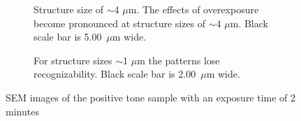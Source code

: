\begin{figure}[!t]
\begin{subfigure}[t]{0.24\linewidth}
    	\label{fig:b2d7_q7}
    \end{subfigure}
    \hfill
    \begin{subfigure}[t]{0.24\linewidth}
    	\centering
    	\caption{Structure size of $\sim$4 $\mu$m. The effects of overexposure become pronounced at structure sizes of $\sim$4 $\mu$m. Black scale bar is 5.00~$\mu$m wide.}
    	\label{fig:b2d9_q9}
    \end{subfigure}
    \hfill
    \begin{subfigure}[t]{0.24\linewidth}
    	\centering
    	\caption{For structure sizes $\sim$1 $\mu$m the patterns lose recognizability. Black scale bar is 2.00~$\mu$m wide.}
    	\label{fig:b2d10_q11}
    \end{subfigure}
    \caption{SEM images of the positive tone sample with an exposure time of 2 minutes}
\end{figure}
